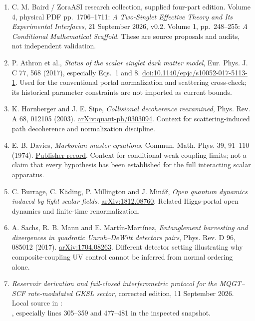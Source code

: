 \documentclass[11pt]{article}
\begin{document}
\begin{enumerate}
\item C. M. Baird / ZoraASI research collection, supplied four-part edition.
Volume 4, physical PDF pp.\ 1706--1711: \emph{A Two-Singlet Effective Theory
and Its Experimental Interfaces}, 21 September 2026, v0.2.
Volume 1, pp.\ 248--255: \emph{A Conditional Mathematical Scaffold}.
These are source proposals and audits, not independent validation.
\item P. Athron et al., \emph{Status of the scalar singlet dark matter model},
Eur. Phys. J. C 77, 568 (2017), especially Eqs.\ 1 and 8.
\href{https://doi.org/10.1140/epjc/s10052-017-5113-1}{doi:10.1140/epjc/s10052-017-5113-1}.
Used for the conventional portal normalization and scattering cross-check;
its historical parameter constraints are not imported as current bounds.
\item K. Hornberger and J. E. Sipe, \emph{Collisional decoherence reexamined},
Phys. Rev. A 68, 012105 (2003).
\href{https://arxiv.org/abs/quant-ph/0303094}{arXiv:quant-ph/0303094}.
Context for scattering-induced path decoherence and normalization discipline.
\item E. B. Davies, \emph{Markovian master equations}, Commun. Math. Phys.
39, 91--110 (1974).
\href{https://doi.org/10.1007/BF01608389}{Publisher record}.
Context for conditional weak-coupling limits; not a claim that every hypothesis
has been established for the full interacting scalar apparatus.
\item C. Burrage, C. K\"ading, P. Millington and J. Min\'a\v r,
\emph{Open quantum dynamics induced by light scalar fields}.
\href{https://arxiv.org/abs/1812.08760}{arXiv:1812.08760}.
Related Higgs-portal open dynamics and finite-time renormalization.
\item A. Sachs, R. B. Mann and E. Mart\'in-Mart\'inez,
\emph{Entanglement harvesting and divergences in quadratic Unruh--DeWitt
detectors pairs}, Phys. Rev. D 96, 085012 (2017).
\href{https://arxiv.org/abs/1704.08263}{arXiv:1704.08263}.
Different detector setting illustrating why composite-coupling UV control
cannot be inferred from normal ordering alone.
\item \emph{Reservoir derivation and fail-closed interferometric protocol for
the MQGT--SCF rate-modulated GKSL sector}, corrected edition,
11 September 2026. Local source in :\\
{\small{}},
especially lines 305--359 and 477--481 in the inspected snapshot.
\end{enumerate}
\end{document}
